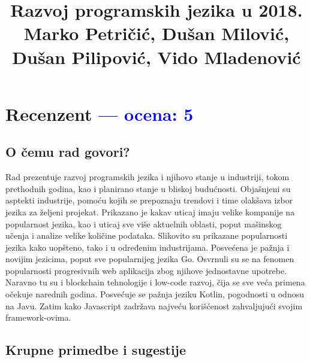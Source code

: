 \documentclass[a4paper]{report}
\newcommand{\odgovor}[1]{\textcolor{blue}{#1}}
\begin{document}
\title{Razvoj programskih jezika u 2018.\\ \small{Marko Petričić, Dušan Milović, Dušan Pilipović, Vido Mladenović}}

\maketitle

\tableofcontents
 
\chapter{Recenzent \odgovor{--- ocena: 5} }


\section{O čemu rad govori?}

Rad prezentuje razvoj programskih jezika i njihovo stanje u industriji, tokom prethodnih godina, kao i planirano stanje u bliskoj budućnosti. Objašnjeni su asptekti industrije, pomoću kojih se prepoznaju trendovi i time olakšava izbor jezika za željeni projekat. Prikazano je kakav uticaj imaju velike kompanije na popularnost jezika, kao i uticaj sve više aktuelnih oblasti, poput mašinskog učenja i analize velike količine podataka. Slikovito su prikazane popularnosti jezika kako uopšteno, tako i u određenim industrijama. Posvećena je pažnja i novijim jezicima, poput sve popularnijeg jezika Go. Osvrnuli su se na fenomen popularnosti progresivnih web aplikacija zbog njihove jednostavne upotrebe. Naravno tu su i blockchain tehnologije i low-code razvoj, čija se sve veća primena očekuje narednih godina. Posvećuje se pažnja jeziku Kotlin,  pogodnosti u odnosu na Javu. Zatim kako Javascript zadržava najveću korišćenost zahvaljujući svojim framework-ovima.

\section{Krupne primedbe i sugestije}
\end{document}
